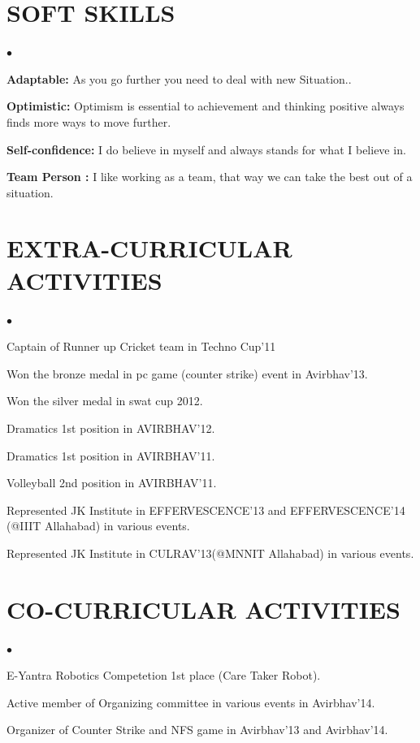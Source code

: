 \documentclass[margin,line]{res}
\newenvironment{list2}{
	\begin{list}{$\bullet$}{%
			\setlength{\itemsep}{0in}
			\setlength{\parsep}{0in} \setlength{\parskip}{0in}
			\setlength{\topsep}{0in} \setlength{\partopsep}{0in}
			\setlength{\leftmargin}{0.3in}}}{\end{list}}
\begin{document}
\begin{resume}
		\section{\sc \bf SOFT SKILLS}
		\begin{list2}
			\item \textbf {Adaptable:} As you go further you need to deal with new Situation..
			\item \textbf{Optimistic:} Optimism is essential to achievement and thinking positive always finds more ways  to move further.
			\item \textbf{Self-confidence:} I do believe in myself and always stands for what I believe in.
			\item \textbf{Team Person :} I like working as a team, that way we can take the best out of a situation.
		\end{list2}
		
		\section{\sc \bf EXTRA-CURRICULAR ACTIVITIES}
		\begin{list2}
			\item Captain of Runner up Cricket team in Techno Cup’11
			\item Won the bronze medal in pc game (counter strike) event in Avirbhav’13.
			\item Won the silver medal in swat cup 2012.
			\item Dramatics 1st position in AVIRBHAV’12. 
			\item Dramatics 1st position in AVIRBHAV’11. 
			\item Volleyball 2nd position in AVIRBHAV’11. 
			\item Represented JK Institute in EFFERVESCENCE’13 and EFFERVESCENCE’14 (@IIIT Allahabad) in various events.
			\item Represented JK Institute in CULRAV’13(@MNNIT Allahabad) in various events.
		\end{list2}
		
		\section{\sc \bf CO-CURRICULAR ACTIVITIES}
		\begin{list2}
			\item E-Yantra Robotics Competetion 1st place (Care Taker Robot).
			\item Active member of  Organizing committee in various events in Avirbhav’14.
			\item Organizer of Counter Strike and NFS game in Avirbhav’13 and Avirbhav’14.
		\end{list2}
		

\end{resume}
\end{document}

